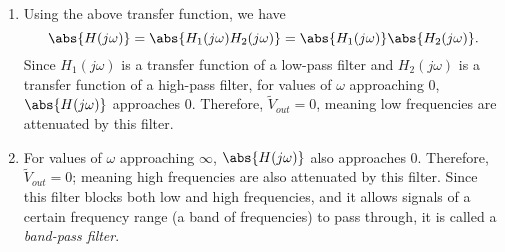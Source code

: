 \begin{enumerate}
{\begin{enumerate}
    Thus, the circuit has the transfer function

    \[
      H(j \omega) = H_1(j \omega)H_2(j \omega) = \frac{1}{1 + j \omega R_{1}C_{1}} \frac{j \omega R_{2}C_{2}}{1 + j \omega R_{2}C_{2}}
    .\]


  \item Using the above transfer function, we have
     \[
      \abs{H(j \omega)} = \abs{H_1(j \omega)H_2(j \omega)}
      = \abs{H_1(j \omega)}\abs{H_2(j \omega)}
    .\]
    Since $H_1(j \omega)$ is a transfer function of a low-pass filter and $H_2(j \omega)$ is a transfer function of a high-pass filter, for values of $\omega$ approaching $0$, $\abs{H(j \omega)}$ approaches $0$.
    Therefore, $\widetilde{V}_{out} = 0$, meaning low frequencies are attenuated by this filter.

  \item For values of $\omega$ approaching $\infty$, $\abs{H(j \omega)}$ also approaches $0$.
    Therefore, $\widetilde{V}_{out} = 0$; meaning high frequencies are also attenuated by this filter. \vskip 1pt
    Since this filter blocks both low and high frequencies, and it allows signals of a certain frequency range (a band of frequencies) to pass through, it is called a \emph{band-pass filter}.

\end{enumerate}

}



\end{enumerate}
